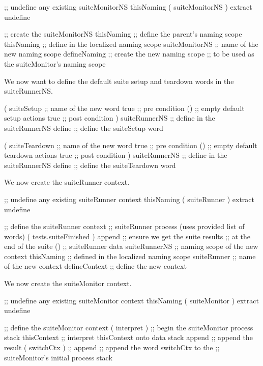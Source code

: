 \startJoylolCode
    ;; undefine any existing suiteMonitorNS
    thisNaming
    ( suiteMonitorNS ) extract
    undefine

    ;; create the suiteMonitorNS
    thisNaming      ;; define the parent's naming scope
    thisNaming      ;; define in the localized naming scope
    suiteMonitorNS  ;; name of the new naming scope
    defineNaming    ;; create the new naming scope
                    ;; to be used as the suiteMonitor's naming scope
\stopJoylolCode

We now want to define the default suite setup and teardown words in the 
suiteRunnerNS. 

\startJoylolCode
    (
      suiteSetup  ;; name of the new word
      { true }    ;; pre condition
      ()          ;; empty default setup actions
      { true }    ;; post condition
    )
    suiteRunnerNS ;; define in the suiteRunnerNS
    define        ;; define the suiteSetup word
\stopJoylolCode

\startJoylolCode
    (
      suiteTeardown ;; name of the new word
      { true } ;; pre condition
      ()            ;; empty default teardown actions
      { true } ;; post condition
    )
    suiteRunnerNS ;; define in the suiteRunnerNS
    define        ;; define the suiteTeardown word
\stopJoylolCode

We now create the suiteRunner context.

\startJoylolCode
    ;; undefine any existing suiteRunner context
    thisNaming
    ( suiteRunner ) extract
    undefine

    ;; define the suiteRunner context
                ;; suiteRunner process (uses provided list of words)
    ( tests.suiteFinished )
    append        ;; ensure we get the suite results
                  ;; at the end of the suite
    ()            ;; suiteRunner data
    suiteRunnerNS ;; naming scope of the new context
    thisNaming    ;; defined in the localized naming scope
    suiteRunner   ;; name of the new context
    defineContext ;; define the new context
\stopJoylolCode

We now create the suiteMonitor context.

\startJoylolCode
    ;; undefine any existing suiteMonitor context
    thisNaming
    ( suiteMonitor ) extract
    undefine

    ;; define the suiteMonitor context
    ( interpret )   ;; begin the suiteMonitor process stack
    thisContext     ;; interpret thisContext onto data stack
    append          ;; append the result
    ( switchCtx )   ;;
    append          ;; append the word switchCtx to the 
                    ;; suiteMonitor's initial process stack
  
